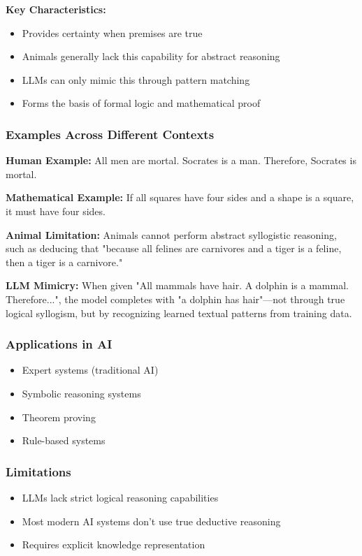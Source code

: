 \textbf{Key Characteristics:}
\begin{itemize}
    \item Provides certainty when premises are true
    \item Animals generally lack this capability for abstract reasoning
    \item LLMs can only mimic this through pattern matching
    \item Forms the basis of formal logic and mathematical proof
\end{itemize}

\subsubsection{Examples Across Different Contexts}
\textbf{Human Example:} All men are mortal. Socrates is a man. Therefore, Socrates is mortal.

\textbf{Mathematical Example:} If all squares have four sides and a shape is a square, it must have four sides.

\textbf{Animal Limitation:} Animals cannot perform abstract syllogistic reasoning, such as deducing that "because all felines are carnivores and a tiger is a feline, then a tiger is a carnivore."

\textbf{LLM Mimicry:} When given "All mammals have hair. A dolphin is a mammal. Therefore...", the model completes with "a dolphin has hair"---not through true logical syllogism, but by recognizing learned textual patterns from training data.

\subsubsection{Applications in AI}
\begin{itemize}
    \item Expert systems (traditional AI)
    \item Symbolic reasoning systems
    \item Theorem proving
    \item Rule-based systems
\end{itemize}

\subsubsection{Limitations}
\begin{itemize}
    \item LLMs lack strict logical reasoning capabilities
    \item Most modern AI systems don't use true deductive reasoning
    \item Requires explicit knowledge representation
\end{itemize}

